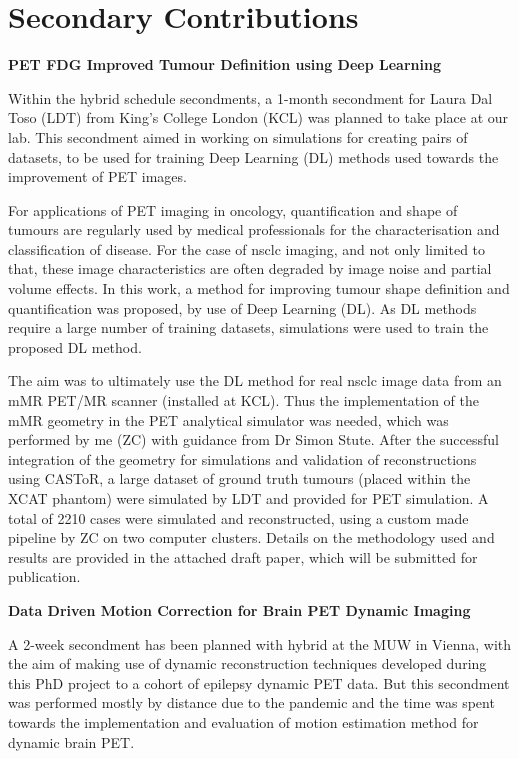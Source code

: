 \chapter*{Secondary Contributions}
\label{Secondary_Contributions}

\textbf{PET FDG Improved Tumour Definition using Deep Learning}

Within the \gls{hybrid} schedule secondments, a 1-month secondment for Laura Dal Toso (LDT) from King's College London (KCL) was planned to take place at our lab. This secondment aimed in working on simulations for creating pairs of datasets, to be used for training Deep Learning (DL) methods used towards the improvement of PET images.

For applications of PET imaging in oncology, quantification and shape of tumours are regularly used by medical professionals for the characterisation and classification of disease. For the case of \gls{nsclc} imaging, and not only limited to that, these image characteristics are often degraded by image noise and partial volume effects.
In this work, a method for improving tumour shape definition and quantification was proposed, by use of Deep Learning (DL). As DL methods require a large number of training datasets, simulations were used to train the proposed DL method. 

The aim was to ultimately use the DL method for real \gls{nsclc} image data from an mMR PET/MR scanner (installed at KCL). Thus the implementation of the mMR geometry in the PET analytical simulator was needed, which was performed by me (ZC) with guidance from Dr Simon Stute. After the successful integration of the geometry for simulations and validation of reconstructions using CASToR, a large dataset of ground truth tumours (placed within the XCAT phantom) were simulated by LDT and provided for PET simulation. A total of 2210 cases were simulated and reconstructed, using a custom made pipeline by ZC on two computer clusters.
Details on the methodology used and results are provided in the attached draft paper, which will be submitted for publication.

\textbf{Data Driven Motion Correction for Brain PET Dynamic Imaging}

A 2-week secondment has been planned with \gls{hybrid} at the MUW in Vienna, with the aim of making use of dynamic reconstruction techniques developed during this PhD project to a cohort of epilepsy dynamic PET data. But this secondment was performed mostly by distance due to the pandemic and the time was spent towards the implementation and evaluation of motion estimation method for dynamic brain PET. 

